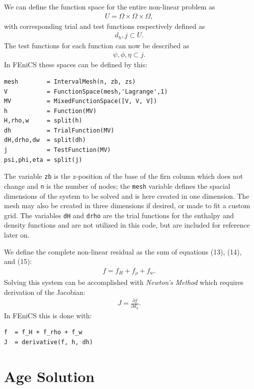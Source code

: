 \documentclass{article}%
\begin{document}
We can define the function space for the entire non-linear problem as 
\begin{align*}
    U = \Omega \times \Omega \times \Omega,
\end{align*}
with corresponding trial and test functions respectively defined as
\begin{align*}
    d_h, j \subset U.
\end{align*}
The test functions for each function can now be described as
\begin{align*}
    \psi, \phi, \eta \subset j.
\end{align*}
In FEniCS these spaces can be defined by this:
\footnotesize
\begin{verbatim}
mesh        = IntervalMesh(n, zb, zs)
V           = FunctionSpace(mesh,'Lagrange',1)
MV          = MixedFunctionSpace([V, V, V])
h           = Function(MV)
H,rho,w     = split(h)    
dh          = TrialFunction(MV)
dH,drho,dw  = split(dh)
j           = TestFunction(MV)
psi,phi,eta = split(j)
\end{verbatim}
\normalsize
The variable \texttt{zb} is the z-position of the base of the firn column which does not change and \texttt{n} is the number of nodes; the \texttt{mesh} variable defines the spacial dimensions of the system to be solved and is here created in one dimension.  The mesh may also be created in three dimensions if desired, or made to fit a custom grid.  The variables \texttt{dH} and \texttt{drho} are the trial functions for the enthalpy and density functions and are not utilized in this code, but are included for reference later on.

We define the complete non-linear residual as the sum of equations (13), (14), and (15): 
\begin{align*}
    f = f_H + f_{\rho} + f_w.
\end{align*}
Solving this system can be accomplished with \emph{Newton's Method} which requires derivation of the Jacobian:
\begin{align*}
    J = \frac{\partial f}{\partial d_h}.
\end{align*}
In FEniCS this is done with:
\footnotesize
\begin{verbatim}
f  = f_H + f_rho + f_w
J  = derivative(f, h, dh)
\end{verbatim}
\normalsize


\section{Age Solution}
\end{document}
